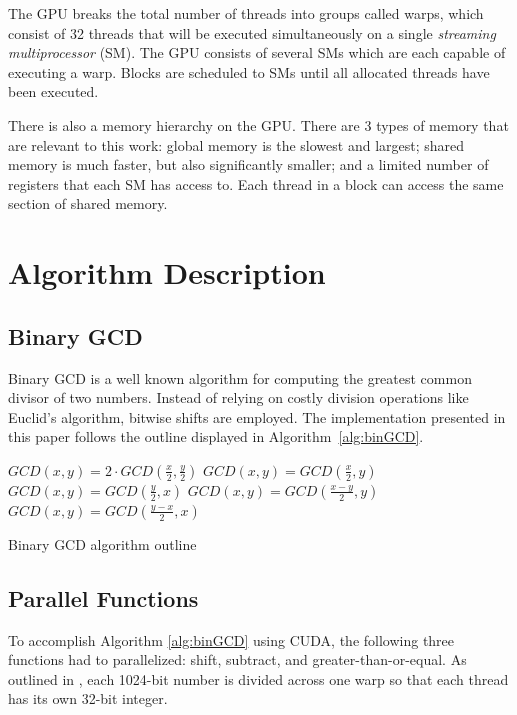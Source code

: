 \documentclass[10pt, conference]{./IEEEtran}
\begin{document}
The GPU breaks the total number of threads into groups called warps, which 
consist of 32 threads that will be executed simultaneously on a single
\textit{streaming multiprocessor} (SM). The GPU consists of several SMs which 
are each capable of executing a warp. Blocks are scheduled to SMs until all 
allocated threads have been executed. 

There is also a memory hierarchy on the GPU. There are 3 types of memory 
that are relevant to this work: global memory is the slowest and 
largest; shared memory is much faster, but also significantly smaller; and 
a limited number of registers that each SM has access to. Each thread in a
block can access the same section of shared memory.

\section{Algorithm Description}
\subsection{Binary GCD}
Binary GCD is a well known algorithm for computing the greatest common divisor 
of two numbers. Instead of relying on costly division operations like Euclid's 
algorithm, bitwise shifts are employed. The implementation
presented in this paper follows the outline displayed in Algorithm~\ref{alg:binGCD}.

\begin{algorithm}
   \nl{} {
      \nl{} {
         \nl$GCD(x, y) = 2 \cdot GCD(\frac{x}{2}, \frac{y}{2})$\;
      }\nl{} {
         \nl$GCD(x, y) = GCD(\frac{x}{2}, y)$\;
      }\nl{} {
         \nl$GCD(x, y) = GCD(\frac{y}{2}, x)$\;
      }\nl{} {
         \nl{} {
            \nl$GCD(x, y) = GCD(\frac{x - y}{2}, y)$\;
         }{
            \nl$GCD(x, y) = GCD(\frac{y - x}{2}, x)$\;
        }
      }
   }
   \caption{Binary GCD algorithm outline}
   \label{alg:binGCD}
\end{algorithm}

\subsection{Parallel Functions}
To accomplish Algorithm \ref{alg:binGCD} using CUDA, the following three 
functions had to parallelized: shift, subtract, and greater-than-or-equal. As 
outlined in \cite{fujimoto2009high}, each 1024-bit number is divided across one 
warp so that each thread has its own 32-bit integer. 
\end{document}
